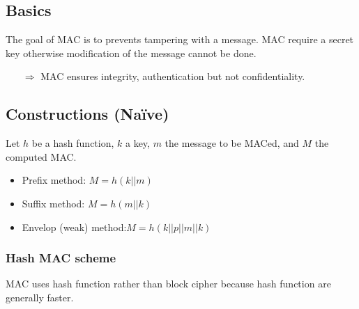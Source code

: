 
\subsection{Basics}
The goal of MAC is to prevents tampering with a message. MAC require a secret
key otherwise modification of the message cannot be done. 
\begin{itemize}
    \item[$\Rightarrow$] MAC ensures integrity, authentication but not confidentiality.
\end{itemize}

\subsection{Constructions (Naïve)}
Let $h$ be a hash function, $k$ a key, $m$ the message to be MACed, and $M$ the
computed MAC.
\begin{itemize}
    \item Prefix method: $ M = h(k||m) $
    \item Suffix method: $ M = h(m||k) $
    \item Envelop (weak) method:$ M = h(k||p||m||k) $
\end{itemize}

\subsubsection{Hash MAC scheme}
MAC uses hash function rather than block cipher because hash function are
generally faster.

